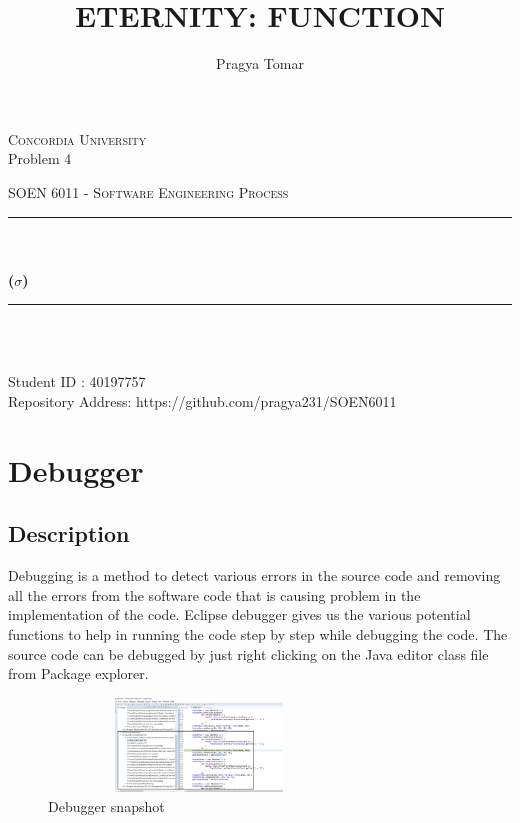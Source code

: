 \documentclass[12pt]{report}
\title{ETERNITY: FUNCTION}
\author{Pragya Tomar}
\date{}
\makeatletter
\let\thetitle\@title
\let\theauthor\@author
\makeatother
\begin{document}
\begin{titlepage}
	\centering
    \vspace*{1 cm}
\begin{center}    \textsc{\Large Concordia University}\\[2.5 cm]	
{Problem 4 }\\[0.4 cm]
\end{center}
	\textsc{\Large  SOEN 6011 - Software Engineering Process }\\[1 cm]
	\rule{\linewidth}{0.5 mm} \\[0.4 cm]
	{ \huge \textbf \thetitle}\\[0.5 cm]
	{ \huge \textbf{($\sigma$)}}
	\rule{\linewidth}{0.5 mm} \\[1.0 cm]

	
\begin{center}   {\Large \textbf{\theauthor}} \\[1 cm]
                 {\large Student ID : 40197757 }\\[0.4 cm]
                 {\large Repository Address: https://github.com/pragya231/SOEN6011}
\end{center}
	
\end{titlepage}

\tableofcontents
\pagebreak

\renewcommand{\thesection}{\arabic{section}}


\section{\Large \vspace{0.1 cm}Debugger}

\subsection{\Large Description}
Debugging is a method to detect various errors in the source code and removing all the errors from the software code that is causing problem in the implementation of the code.
Eclipse debugger gives us the various potential functions to help in running the code step by step while debugging the code. 
The source code can be debugged by just right clicking on the Java editor class file from Package explorer. 

\begin{figure}[h!]
\begin{center}
\includegraphics[width=8cm, height=2.5cm]{images/UtilityDebugger.png} 
  \end{center}
  \caption{Debugger snapshot}
\end{figure}
\end{document}
